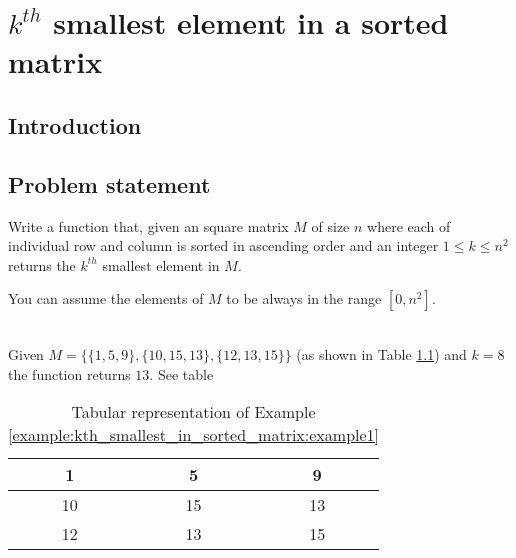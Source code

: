 %



\chapter{$k^{th}$ smallest element in a sorted matrix}
\label{ch:kth_smallest_in_sorted_matrix}
\section*{Introduction}

\section{Problem statement}
\begin{exercise}
\label{example:kth_smallest_in_sorted_matrix:exercice1}
Write a function that, given an square matrix $M$ of size $n$  where each of individual row and column is sorted in ascending order and an integer $1 \leq k \leq n^2$
returns the $k^{th}$ smallest element in $M$.


You can assume the elements of $M$ to be always in the range $[0,n^2]$.

	\begin{example}
		\label{example:kth_smallest_in_sorted_matrix:example1}
		\hfill \\
		Given $M=\{\{1,5,9\},\{10,15,13\},\{12,13,15\}\}$ (as shown in Table \ref{}) and $k=8$ the function returns $13$. See table
	\end{example}
\end{exercise}
\begin{wraptable}{r}{3.5cm}
	\centering
	\begin{tabular}{|c|c|c|}
	\hline
	1  & 5  & 9  \\ \hline
	10 & 15 & 13 \\ \hline
	12 & 13 & 15 \\ \hline
	\end{tabular}%
	\caption{Tabular representation of Example \ref{example:kth_smallest_in_sorted_matrix:example1}}
	\label{tab:kth_smallest_in_sorted_matrix:example1}
\end{wraptable} 


